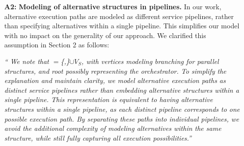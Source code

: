 {\begin{enumerate}
        By incorporating these insights earlier, we aim to strengthen the rationale behind our assumption and provide better context for its application in this work.

        

        


        \item[\textbf{A2:}] \textbf{Modeling of alternative structures in pipelines.} In our work, alternative execution paths are modeled as different service pipelines, rather than specifying alternatives within a single pipeline. This simplifies our model with no impact on the generality of our approach. We clarified this assumption in Section 2 as follows:
        
              \vspace{0.5em}
        
              \begin{adjustwidth}{10pt}{10pt}
                  \em``{\color{OurColor}
                  We note that \V$=$\{,\}$\cup$$V_S$, with vertices  modeling branching for parallel structures, and root  possibly representing the orchestrator. To simplify the explanation and maintain clarity, we model alternative execution paths as distinct service pipelines rather than embedding alternative structures within a single pipeline. This representation is equivalent to having alternative structures within a single pipeline, as each distinct pipeline corresponds to one possible execution path. By separating these paths into individual pipelines, we avoid the additional complexity of modeling alternatives within the same structure, while still fully capturing all execution possibilities.}''
                  \vspace{0.5em}
              \end{adjustwidth}
              

\end{enumerate}}
